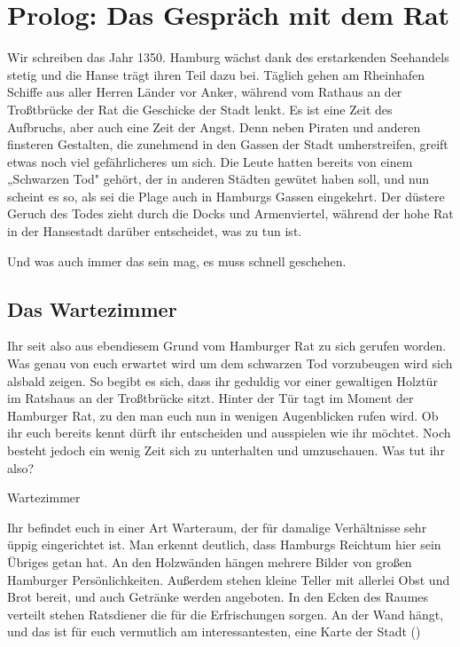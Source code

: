 
\chapter{Prolog: Das Gespräch mit dem Rat}
\label{adventure}

\begin{advquote}
\large Wir schreiben das Jahr 1350. Hamburg wächst dank des erstarkenden Seehandels
stetig und die Hanse trägt ihren Teil dazu bei. Täglich gehen am Rheinhafen Schiffe
aus aller Herren Länder vor Anker, während vom Rathaus an der Troßtbrücke der Rat die
Geschicke der Stadt lenkt. Es ist eine Zeit des Aufbruchs, aber auch eine Zeit der
Angst. Denn neben Piraten und anderen finsteren Gestalten, die zunehmend in den
Gassen der Stadt umherstreifen, greift etwas noch viel gefährlicheres um sich. Die
Leute hatten bereits von einem „Schwarzen Tod" gehört, der in anderen Städten gewütet
haben soll, und nun scheint es so, als sei die Plage auch in Hamburgs Gassen
eingekehrt. Der düstere Geruch des Todes zieht durch die Docks und Armenviertel,
während der hohe Rat in der Hansestadt darüber entscheidet, was zu tun ist.

Und was auch immer das sein mag, es muss schnell geschehen.
\end{advquote}

\section{Das Wartezimmer}
\label{sec:wartezimmer}

Ihr seit also aus ebendiesem Grund vom Hamburger Rat zu sich gerufen worden. Was
genau von euch erwartet wird um dem schwarzen Tod vorzubeugen wird sich alsbald
zeigen. So begibt es sich, dass ihr geduldig vor einer gewaltigen Holztür im Ratshaus
an der Troßtbrücke sitzt. Hinter der Tür tagt im Moment der Hamburger Rat, zu den
man euch nun in wenigen Augenblicken rufen wird. Ob ihr euch bereits kennt dürft ihr
entscheiden und ausspielen wie ihr möchtet. Noch besteht jedoch ein wenig Zeit sich
zu unterhalten und umzuschauen. Was tut ihr also?

\begin{place-box}{Wartezimmer}

Ihr befindet euch in einer Art Warteraum, der für damalige Verhältnisse sehr üppig
eingerichtet ist. Man erkennt deutlich, dass Hamburgs Reichtum hier sein Übriges
getan hat. An den Holzwänden hängen mehrere Bilder von großen Hamburger
Persönlichkeiten. Außerdem stehen kleine Teller mit allerlei Obst und Brot bereit,
und auch Getränke werden angeboten. In den Ecken des Raumes verteilt stehen
Ratsdiener die für die Erfrischungen sorgen. An der Wand hängt, und das ist für euch
vermutlich am interessantesten, eine Karte der Stadt (\then {})

\end{place-box}

